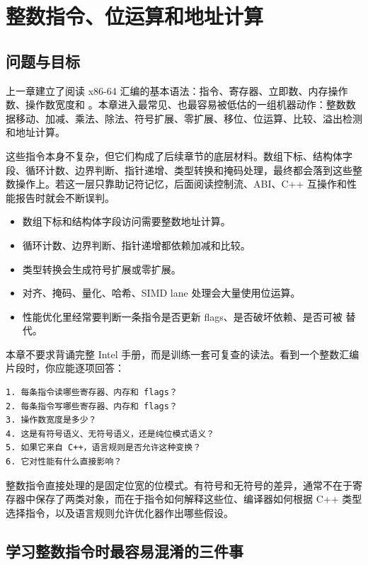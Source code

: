 \chapter{整数指令、位运算和地址计算}

\section{问题与目标}

上一章建立了阅读 x86-64 汇编的基本语法：指令、寄存器、立即数、内存操作数、操作数宽度和 。本章进入最常见、也最容易被低估的一组机器动作：整数数据移动、加减、乘法、除法、符号扩展、零扩展、移位、位运算、比较、溢出检测和地址计算。

这些指令本身不复杂，但它们构成了后续章节的底层材料。数组下标、结构体字段、循环计数、边界判断、指针递增、类型转换和掩码处理，最终都会落到这些整数操作上。若这一层只靠助记符记忆，后面阅读控制流、ABI、C++ 互操作和性能报告时就会不断误判。

\begin{itemize}
  \item 数组下标和结构体字段访问需要整数地址计算。
  \item 循环计数、边界判断、指针递增都依赖加减和比较。
  \item 类型转换会生成符号扩展或零扩展。
  \item 对齐、掩码、量化、哈希、SIMD lane 处理会大量使用位运算。
  \item 性能优化里经常要判断一条指令是否更新 flags、是否破坏依赖、是否可被  替代。
\end{itemize}

本章不要求背诵完整 Intel 手册，而是训练一套可复查的读法。看到一个整数汇编片段时，你应能逐项回答：

\begin{lstlisting}
1. 每条指令读哪些寄存器、内存和 flags？
2. 每条指令写哪些寄存器、内存和 flags？
3. 操作数宽度是多少？
4. 这是有符号语义、无符号语义，还是纯位模式语义？
5. 如果它来自 C++，语言规则是否允许这种变换？
6. 它对性能有什么直接影响？
\end{lstlisting}

\begin{keyidea}
整数指令直接处理的是固定位宽的位模式。有符号和无符号的差异，通常不在于寄存器中保存了两类对象，而在于指令如何解释这些位、编译器如何根据 C++ 类型选择指令，以及语言规则允许优化器作出哪些假设。
\end{keyidea}

\section{学习整数指令时最容易混淆的三件事}

